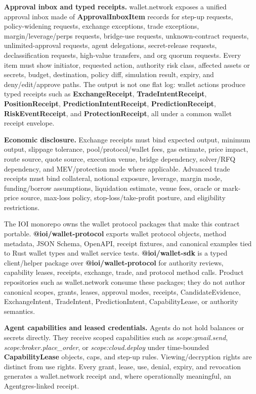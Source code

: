 \documentclass[
  11pt,
]{article}
\begin{document}
\textbf{Approval inbox and typed receipts.} wallet.network exposes a
unified approval inbox made of \textbf{ApprovalInboxItem} records for
step-up requests, policy-widening requests, exchange exceptions, trade
exceptions, margin/leverage/perps requests, bridge-use requests,
unknown-contract requests, unlimited-approval requests, agent
delegations, secret-release requests, declassification requests,
high-value transfers, and org quorum requests. Every item must show
initiator, requested action, authority risk class, affected assets or
secrets, budget, destination, policy diff, simulation result, expiry,
and deny/edit/approve paths. The output is not one flat log: wallet
actions produce typed receipts such as \textbf{ExchangeReceipt},
\textbf{TradeIntentReceipt}, \textbf{PositionReceipt},
\textbf{PredictionIntentReceipt}, \textbf{PredictionReceipt},
\textbf{RiskEventReceipt}, and \textbf{ProtectionReceipt}, all under a
common wallet receipt envelope.

\textbf{Economic disclosure.} Exchange receipts must bind expected
output, minimum output, slippage tolerance, pool/protocol/wallet fees,
gas estimate, price impact, route source, quote source, execution venue,
bridge dependency, solver/RFQ dependency, and MEV/protection mode where
applicable. Advanced trade receipts must bind collateral, notional
exposure, leverage, margin mode, funding/borrow assumptions,
liquidation estimate, venue fees, oracle or mark-price source, max-loss
policy, stop-loss/take-profit posture, and eligibility restrictions.

The IOI monorepo owns the wallet protocol packages that make this
contract portable. \textbf{@ioi/wallet-protocol} exports wallet protocol
objects, method metadata, JSON Schema, OpenAPI, receipt fixtures, and
canonical examples tied to Rust wallet types and wallet service tests.
\textbf{@ioi/wallet-sdk} is a typed client/helper package over
\textbf{@ioi/wallet-protocol} for authority reviews, capability leases, receipts,
exchange, trade, and protocol method calls. Product repositories such as
wallet.network consume these packages; they do not author canonical
scopes, grants, leases, approval modes, receipts, CandidateEvidence,
ExchangeIntent, TradeIntent, PredictionIntent, CapabilityLease, or
authority semantics.

\textbf{Agent capabilities and leased credentials.} Agents do not hold
balances or secrets directly. They receive scoped capabilities such as
\emph{scope:gmail.send}, \emph{scope:broker.place\_order}, or
\emph{scope:cloud.deploy} under time-bounded \textbf{CapabilityLease}
objects,
caps, and step-up rules. Viewing/decryption rights are distinct from
use rights. Every grant, lease, use, denial, expiry, and revocation generates a
wallet.network receipt and, where operationally meaningful, an
Agentgres-linked receipt.
\end{document}
